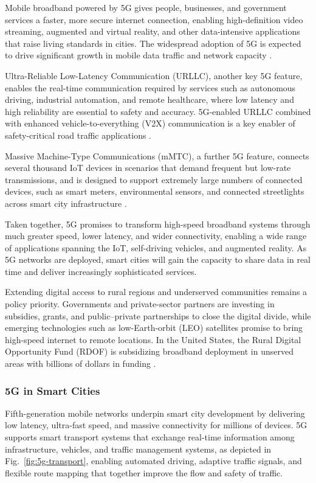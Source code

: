 \documentclass[journal]{IEEEtran}
\begin{document}
Mobile broadband powered by 5G gives people, businesses, and government services a faster, more secure internet connection, enabling high-definition video streaming, augmented and virtual reality, and other data-intensive applications that raise living standards in cities. The widespread adoption of 5G is expected to drive significant growth in mobile data traffic and network capacity \cite{r36}.

Ultra-Reliable Low-Latency Communication (URLLC), another key 5G feature, enables the real-time communication required by services such as autonomous driving, industrial automation, and remote healthcare, where low latency and high reliability are essential to safety and accuracy. 5G-enabled URLLC combined with enhanced vehicle-to-everything (V2X) communication is a key enabler of safety-critical road traffic applications \cite{r36}.

Massive Machine-Type Communications (mMTC), a further 5G feature, connects several thousand IoT devices in scenarios that demand frequent but low-rate transmissions, and is designed to support extremely large numbers of connected devices, such as smart meters, environmental sensors, and connected streetlights across smart city infrastructure \cite{r36}.

Taken together, 5G promises to transform high-speed broadband systems through much greater speed, lower latency, and wider connectivity, enabling a wide range of applications spanning the IoT, self-driving vehicles, and augmented reality. As 5G networks are deployed, smart cities will gain the capacity to share data in real time and deliver increasingly sophisticated services.

Extending digital access to rural regions and underserved communities remains a policy priority. Governments and private-sector partners are investing in subsidies, grants, and public--private partnerships to close the digital divide, while emerging technologies such as low-Earth-orbit (LEO) satellites promise to bring high-speed internet to remote locations. In the United States, the Rural Digital Opportunity Fund (RDOF) is subsidizing broadband deployment in unserved areas with billions of dollars in funding \cite{r32}.

\subsubsection{5G in Smart Cities}
Fifth-generation mobile networks underpin smart city development by delivering low latency, ultra-fast speed, and massive connectivity for millions of devices. 5G supports smart transport systems that exchange real-time information among infrastructure, vehicles, and traffic management systems, as depicted in Fig.~\ref{fig:5g-transport}, enabling automated driving, adaptive traffic signals, and flexible route mapping that together improve the flow and safety of traffic.
\end{document}
